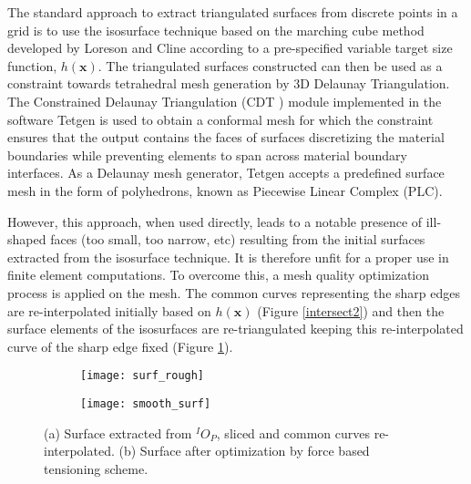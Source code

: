 The standard approach to extract triangulated surfaces from discrete points in a grid is to use the isosurface technique based on the marching cube method developed by Loreson and Cline \cite{lorensenMarchingCubesHigh1987} according to a pre-specified variable target size function, $ h(\textbf{x}) $. The triangulated surfaces constructed can then be used as a constraint towards tetrahedral mesh generation  by 3D Delaunay Triangulation. The Constrained Delaunay Triangulation (CDT \cite{shewchukConstrainedDelaunayTetrahedralizations2002}) module implemented in the software Tetgen \cite{siTetGenDelaunayBasedQuality2015} is used to obtain a conformal mesh for which the constraint ensures that the output contains the faces of surfaces discretizing the material boundaries while preventing elements to span across material boundary interfaces. As a Delaunay mesh generator, Tetgen accepts a predefined surface mesh in the form of polyhedrons, known as Piecewise Linear Complex (PLC).

However, this approach, when used directly, leads to a notable presence of ill-shaped faces (too small, too narrow, etc) resulting from the initial surfaces extracted from the isosurface technique. It is therefore unfit for a proper use in finite element computations. To overcome this, a mesh quality optimization process is applied on the mesh. The common curves representing the sharp edges are re-interpolated initially based on  $ h(\textbf{x}) $ (Figure \ref{intersect2}) and then the surface elements of the isosurfaces are re-triangulated keeping this re-interpolated curve of the sharp edge fixed (Figure \ref{fig:surf_smooth}). 
\begin{figure}
	\centering
	\begin{subfigure}[b]{0.45\textwidth}
		\texttt{[image: surf\_rough]}
		\caption{}
	\end{subfigure}
	\begin{subfigure}[b]{0.45\textwidth}
		\texttt{[image: smooth\_surf]}
		\caption{}
	\end{subfigure}
	\caption{(a) Surface extracted from $ ^IO_P $, sliced and common curves re-interpolated. (b) Surface after optimization by force based tensioning scheme.}\label{fig:surf_smooth}
\end{figure}


